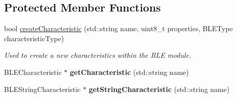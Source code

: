 \subsection*{Protected Member Functions}
\begin{DoxyCompactItemize}
\item 
bool \hyperlink{class_bottle_buddy_1_1_embedded_1_1_pipeline_1_1_service_a7883b3a53fc8e6f9d457d7d164853c37}{create\+Characteristic} (std\+::string name, uint8\+\_\+t properties, B\+L\+E\+Type characteristic\+Type)
\begin{DoxyCompactList}\small\item\em Used to create a new characteristics within the B\+LE module. \end{DoxyCompactList}\item 
B\+L\+E\+Characteristic $\ast$ {\bfseries get\+Characteristic} (std\+::string name)\hypertarget{class_bottle_buddy_1_1_embedded_1_1_pipeline_1_1_service_a3dbda00416a45e1e5d0a8652fd126768}{}\label{class_bottle_buddy_1_1_embedded_1_1_pipeline_1_1_service_a3dbda00416a45e1e5d0a8652fd126768}

\item 
B\+L\+E\+String\+Characteristic $\ast$ {\bfseries get\+String\+Characteristic} (std\+::string name)\hypertarget{class_bottle_buddy_1_1_embedded_1_1_pipeline_1_1_service_ab5c898cc7b6ebde52a8205579890a105}{}\label{class_bottle_buddy_1_1_embedded_1_1_pipeline_1_1_service_ab5c898cc7b6ebde52a8205579890a105}

\end{DoxyCompactItemize}

